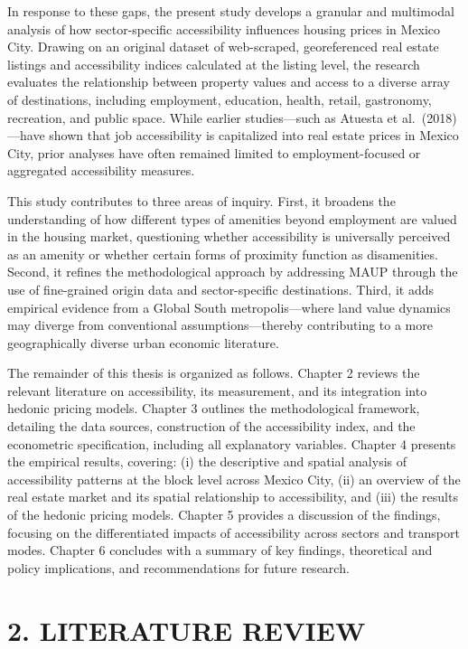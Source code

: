 \documentclass[
  12pt,
]{report}
\begin{document}
In response to these gaps, the present study develops a granular and
multimodal analysis of how sector-specific accessibility influences
housing prices in Mexico City. Drawing on an original dataset of
web-scraped, georeferenced real estate listings and accessibility
indices calculated at the listing level, the research evaluates the
relationship between property values and access to a diverse array of
destinations, including employment, education, health, retail,
gastronomy, recreation, and public space. While earlier studies---such
as Atuesta et al.~(2018)---have shown that job accessibility is
capitalized into real estate prices in Mexico City, prior analyses have
often remained limited to employment-focused or aggregated accessibility
measures.

This study contributes to three areas of inquiry. First, it broadens the
understanding of how different types of amenities beyond employment are
valued in the housing market, questioning whether accessibility is
universally perceived as an amenity or whether certain forms of
proximity function as disamenities. Second, it refines the
methodological approach by addressing MAUP through the use of
fine-grained origin data and sector-specific destinations. Third, it
adds empirical evidence from a Global South metropolis---where land
value dynamics may diverge from conventional assumptions---thereby
contributing to a more geographically diverse urban economic literature.

The remainder of this thesis is organized as follows. Chapter 2 reviews
the relevant literature on accessibility, its measurement, and its
integration into hedonic pricing models. Chapter 3 outlines the
methodological framework, detailing the data sources, construction of
the accessibility index, and the econometric specification, including
all explanatory variables. Chapter 4 presents the empirical results,
covering: (i) the descriptive and spatial analysis of accessibility
patterns at the block level across Mexico City, (ii) an overview of the
real estate market and its spatial relationship to accessibility, and
(iii) the results of the hedonic pricing models. Chapter 5 provides a
discussion of the findings, focusing on the differentiated impacts of
accessibility across sectors and transport modes. Chapter 6 concludes
with a summary of key findings, theoretical and policy implications, and
recommendations for future research.

\newpage

\chapter{2. LITERATURE REVIEW}\label{literature-review}
\end{document}
